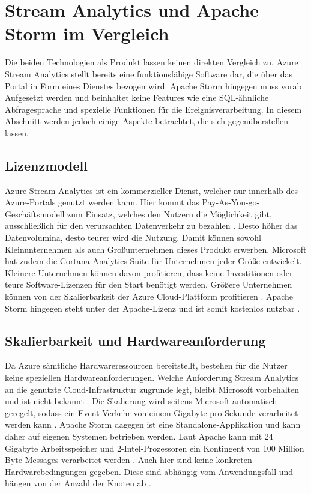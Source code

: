 \section{Stream Analytics und Apache Storm im Vergleich}
Die beiden Technologien als Produkt lassen keinen direkten Vergleich zu. Azure Stream Analytics stellt bereits eine funktionsfähige Software dar, die über das Portal in Form eines Dienstes bezogen wird. Apache Storm hingegen muss vorab Aufgesetzt werden und beinhaltet keine Features wie eine SQL-ähnliche Abfragesprache und spezielle Funktionen für die Ereignisverarbeitung. In diesem Abschnitt werden jedoch einige Aspekte betrachtet, die sich gegenüberstellen lassen. 

\subsection{Lizenzmodell}
Azure Stream Analytics ist ein kommerzieller Dienst, welcher nur innerhalb des Azure-Portals genutzt werden kann. Hier kommt das Pay-As-You-go-Geschäftsmodell zum Einsatz, welches den Nutzern die Möglichkeit gibt, ausschließlich für den verursachten Datenverkehr zu bezahlen \cite{Pricing.2017}. Desto höher das Datenvolumina, desto teurer wird die Nutzung. Damit können sowohl Kleinunternehmen als auch Großunternehmen dieses Produkt erwerben. Microsoft hat zudem die Cortana Analytics Suite für Unternehmen jeder Größe entwickelt. Kleinere Unternehmen können davon profitieren, dass keine Investitionen oder teure Software-Lizenzen für den Start benötigt werden. Größere Unternehmen können von der Skalierbarkeit der Azure Cloud-Plattform profitieren \cite{Azure.2017}. Apache Storm hingegen steht unter der Apache-Lizenz und ist somit kostenlos nutzbar \cite{lizenz.2004}. 

\subsection{Skalierbarkeit und Hardwareanforderung}
Da Azure sämtliche Hardwareressourcen bereitstellt, bestehen für die Nutzer keine speziellen Hardwareanforderungen. Welche Anforderung Stream Analytics an die genutzte Cloud-Infrastruktur zugrunde legt, bleibt Microsoft vorbehalten und ist nicht bekannt \cite{samacha.2017}. Die Skalierung wird seitens Microsoft automatisch geregelt, sodass ein Event-Verkehr von einem Gigabyte pro Sekunde verarbeitet werden kann \cite{samacha.19.12.2017b}. Apache Storm dagegen ist eine Standalone-Applikation und kann daher auf eigenen Systemen betrieben werden. Laut Apache kann mit 24 Gigabyte Arbeitsspeicher und 2-Intel-Prozessoren ein Kontingent von 100 Million Byte-Messages verarbeitet werden \cite{apachescale.2017}. Auch hier sind keine konkreten Hardwarebedingungen gegeben. Diese sind abhängig vom Anwendungsfall und hängen von der Anzahl der Knoten ab \cite{samacha.2017}.

